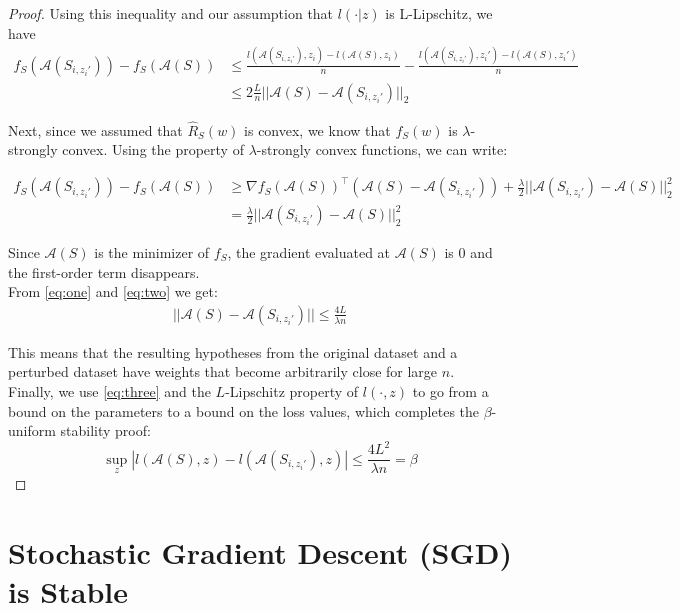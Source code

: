 \documentclass{article}
\begin{document}
\begin{proof}
Using this inequality and our assumption that $l(\cdot|z)$ is L-Lipschitz, we have
\begin{align}
f_S(\mathcal{A}(S_{i,z_i'})) - f_S(\mathcal{A}(S)) &\leq \frac{l(\mathcal{A}(S_{i,z_i'}), z_i) - l(\mathcal{A}(S), z_i)}{n} - \frac{l(\mathcal{A}(S_{i,z_i'}), z_i') - l(\mathcal{A}(S),z_i')}{n} \nonumber\\
&\leq 2\frac{L}{n}||\mathcal{A}(S)-\mathcal{A}(S_{i,z_i'})||_2 \label{eq:one}
\end{align}

Next, since we assumed that $\hat{R}_S(w)$ is convex, we know that $f_S(w)$ is $\lambda$-strongly convex. Using the property of $\lambda$-strongly convex functions, we can write:

\begin{align}
    f_S(\mathcal{A}(S_{i,z_i'})) - f_S(\mathcal{A}(S)) &\geq \nabla f_S(\mathcal{A}(S))^\top (\mathcal{A}(S) - \mathcal{A}(S_{i,z_i'})) +  \frac{\lambda}{2}||\mathcal{A}(S_{i,z_i'}) - \mathcal{A}(S)||_2^2 \\
    &= \frac{\lambda}{2}||\mathcal{A}(S_{i,z_i'}) - \mathcal{A}(S)||_2^2
\label{eq:two}
\end{align}


Since $\mathcal{A}(S)$ is the minimizer of $f_S$, the gradient evaluated at $\mathcal{A}(S)$ is $0$ and the first-order term disappears. \\

From \ref{eq:one} and \ref{eq:two} we get:
\begin{align}
    ||\mathcal{A}(S) - \mathcal{A}(S_{i,z_i'})|| \leq \frac{4L}{\lambda n}
\label{eq:three}
\end{align}

This means that the resulting hypotheses from the original dataset and a perturbed dataset have weights that become arbitrarily close for large $n$.\\

Finally, we use \ref{eq:three} and the $L$-Lipschitz property of $l(\cdot,z)$ to go from a bound on the parameters to a bound on the loss values, which completes the $\beta$-uniform stability proof:
$$\sup_z|l(\mathcal{A}(S), z) - l(\mathcal{A}(S_{i,z_i'}), z)| \leq \frac{4L^2}{\lambda n} = \beta$$
\end{proof}


\section*{Stochastic Gradient Descent (SGD) is Stable}
\end{document}
